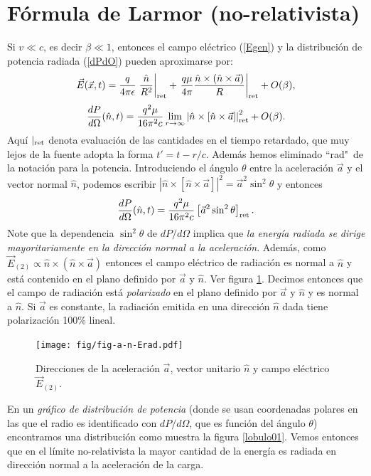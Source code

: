 \section{Fórmula de Larmor (no-relativista)}\label{sec:Larmor-norel}

Si $v\ll c$, es decir $\beta\ll1$, entonces el campo eléctrico
(\ref{Egen}) y la distribución de potencia radiada (\ref{dPdO}) pueden
aproximarse por:
\begin{equation}
\vec{E}(\vec{x},t)=\frac{q}{4\pi\epsilon}\left.\frac{\hat{n}}{R^2}\right|_{\rm ret}+\left.
\frac{q\mu}{4\pi}\frac{\hat{n}\times(\hat{n}\times{\vec{a}})}{R}\right|_{\rm
ret} +O(\beta),
\end{equation}
\begin{equation}
\frac{dP}{d\Omega}(\hat{n},t)=\frac{q^2\mu}{16\pi^2c}\lim_{r\rightarrow\infty}
\left|\hat{n}\times\left[
\hat{n}\times{\vec{a}}\right]\right|^2_{\rm ret}  +O(\beta).
\end{equation}
Aquí $|_{\rm ret}$ denota evaluación de las cantidades en el tiempo retardado, que muy lejos de la fuente adopta la forma $t'=t-r/c$. Además hemos eliminado ``rad"\, de la notación para la potencia.
Introduciendo el ángulo $\theta$ entre la aceleración $\vec{a}$ y el vector
normal $\hat{n}$, podemos escribir
$\left|\hat{n}\times\left[\hat{n}\times{\vec{a}}\right]\right|^2=\vec{a}^2\sin^2\theta$ y entonces
\begin{equation}
\frac{dP}{d\Omega}(\hat{n},t)=\frac{q^2\mu}{16\pi^2 c}\left[ \vec{a}^2\sin^2\theta\right]_{\rm
ret} .\label{Lardif}
\end{equation}
 Note que la dependencia $\sin^2\theta$ de ${dP}/{d\Omega}$ implica que \textit{la energía radiada se dirige mayoritariamente en la dirección normal a la aceleración}. Además, como $\vec{E}_{(2)}\propto \hat{n}\times(\hat{n}\times{\vec{a}})$ entonces el campo eléctrico de radiación  es normal a $\hat{n}$ y está contenido en el plano definido por $\vec{a}$ y $\hat{n}$. Ver figura \ref{fig:natheta}. Decimos entonces que el campo de radiación está
\textit{polarizado} en el plano definido por $\vec{a}$ y $\hat{n}$ y es normal a $\hat{n}$. Si $\vec{a}$ es constante, la radiación emitida en una dirección $\hat{n}$ dada tiene polarización 100\% lineal.
\begin{figure}[!h]
\centerline{\texttt{[image: fig/fig-a-n-Erad.pdf]}}
\caption{Direcciones de la aceleración $\vec{a}$, vector unitario $\hat{n}$ y campo eléctrico $\vec{E}_{(2)}$.}
\label{fig:natheta}
\end{figure}
En un \textit{gráfico de distribución de potencia} (donde se usan coordenadas polares en las que el radio es identificado con ${dP}/{d\Omega}$, que es función del ángulo $\theta$) encontramos una distribución como muestra la figura \ref{lobulo01}. Vemos entonces que en el límite no-relativista la mayor cantidad de la energía es radiada en dirección normal a la aceleración de la carga.

